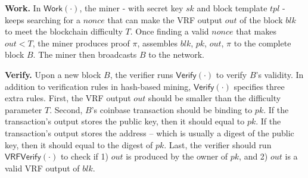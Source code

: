 \textbf{Work.}
In $\mathsf{Work}(\cdot)$, the miner - with secret key $sk$ and block template $tpl$ - keeps searching for a $nonce$ that can make the VRF output $out$ of the block $blk$ to meet the blockchain difficulty $T$.
Once finding a valid $nonce$ that makes $out < T$, the miner produces proof $\pi$, assembles $blk$, $pk$, $out$, $\pi$ to the complete block $B$.
The miner then broadcasts $B$ to the network.

\textbf{Verify.}
Upon a new block $B$, the verifier runs $\mathsf{Verify}(\cdot)$ to verify $B$'s validity.
In addition to verification rules in hash-based mining, $\mathsf{Verify}(\cdot)$ specifies three extra rules.
First, the VRF output $out$ should be smaller than the difficulty parameter $T$.
Second, $B$'s coinbase transaction should be binding to $pk$.
If the transaction's output stores the public key, then it should equal to $pk$.
If the transaction's output stores the address -- which is usually a digest of the public key, then it should equal to the digest of $pk$.
Last, the verifier should run $\mathsf{VRFVerify}(\cdot)$ to check if 1) $out$ is produced by the owner of $pk$, and 2) $out$ is a valid VRF output of $blk$.